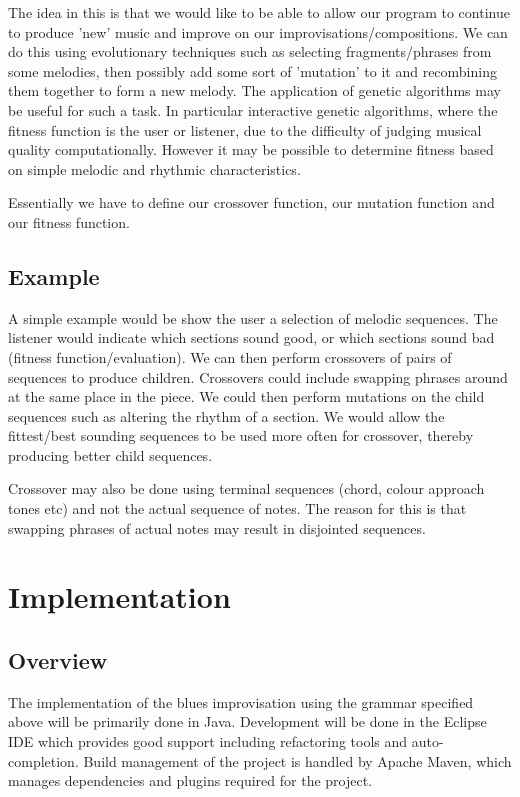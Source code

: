 \documentclass[pdftex,12pt,a4paper]{report}
\begin{document}
The idea in this is that we would like to be able to allow our program to continue to produce 'new' music and improve on our improvisations/compositions. We can do this using evolutionary techniques such as selecting fragments/phrases from some melodies, then possibly add some sort of 'mutation' to it and recombining them together to form a new melody. The application of genetic algorithms may be useful for such a task. In particular interactive genetic algorithms, where the fitness function is the user or listener, due to the difficulty of judging musical quality computationally. However it may be possible to determine fitness based on simple melodic and rhythmic characteristics. 

Essentially we have to define our crossover function, our mutation function and our fitness function.

\section{Example}
A simple example would be show the user a selection of melodic sequences. The listener would indicate which sections sound good, or which sections sound bad (fitness function/evaluation). We can then perform crossovers of pairs of sequences to produce children. Crossovers could include swapping phrases around at the same place in the piece. We could then perform mutations on the child sequences such as altering the rhythm of a section. We would allow the fittest/best sounding sequences to be used more often for crossover, thereby producing better child sequences.

Crossover may also be done using terminal sequences (chord, colour approach tones etc) and not the actual sequence of notes. The reason for this is that swapping phrases of actual notes may result in disjointed sequences.

\chapter{Implementation}

\section{Overview}
The implementation of the blues improvisation using the grammar specified above will be primarily done in Java. Development will be done in the Eclipse IDE which provides good support including refactoring tools and auto-completion. Build management of the project is handled by Apache Maven, which manages dependencies and plugins required for the project. 
\end{document}
